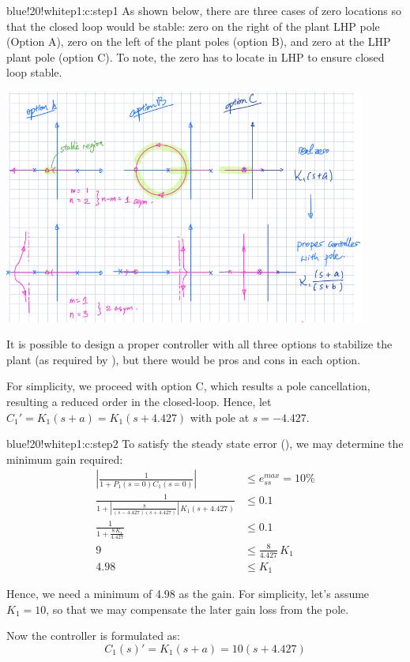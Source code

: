 \documentclass{tron}
\begin{document}
	\begin{note}{blue!20!white}{p1:c:step1}
		As  shown below, there are three cases of zero locations so that the closed loop would be stable: zero on the right of the plant \Gls{LHP} pole (Option A), zero on the left of the plant poles (option B), and zero at the \Gls{LHP} plant pole (option C). To note, the zero has to locate in LHP to ensure closed loop stable.
	
		{	
			\centering
	      	\includegraphics[width=450px]{Fig/root-locus}
	      	\par
	    }
	    
	    It is possible to design a proper controller with all three options to stabilize the plant (as required by ), but there would be pros and cons in each option.
	    
	    For simplicity, we proceed with option C, which results a pole cancellation, resulting a reduced order in the closed-loop. Hence, let $C_1' = K_1 (s+a) = K_1 (s + 4.427)$ with pole at $s = -4.427$.	
	\end{note}
	
	\begin{note}{blue!20!white}{p1:c:step2}
		To satisfy the steady state error (), we may determine the minimum gain required:
		\begin{align}
			\left| \frac1{1+P_1(s=0)C_1(s=0)} \right| & \leq e_{ss}^{max} = 10\% \\
			\frac1{1 + \left|\frac{8}{(s-4.427)(s+4.427)}\right| \, K_1 (s + 4.427)}  & \leq 0.1\\
			\frac1{1 + \frac{8 \,  K_1}{4.427}} & \leq 0.1 \\
			9 & \leq \frac{8}{4.427} \, K_1 \\
			4.98 & \leq K_1 
		\end{align}
		
		Hence, we need a minimum of 4.98 as the gain. For simplicity, let's assume $K_1 = 10$, so that we may compensate the later gain loss from the pole.
		
		Now the controller is formulated as:
		\begin{equation}
			C_1(s)' = K_1 (s + a) = 10 (s + 4.427) \label{eqn:c1:gain}
		\end{equation}
	\end{note}
	
\end{document}
